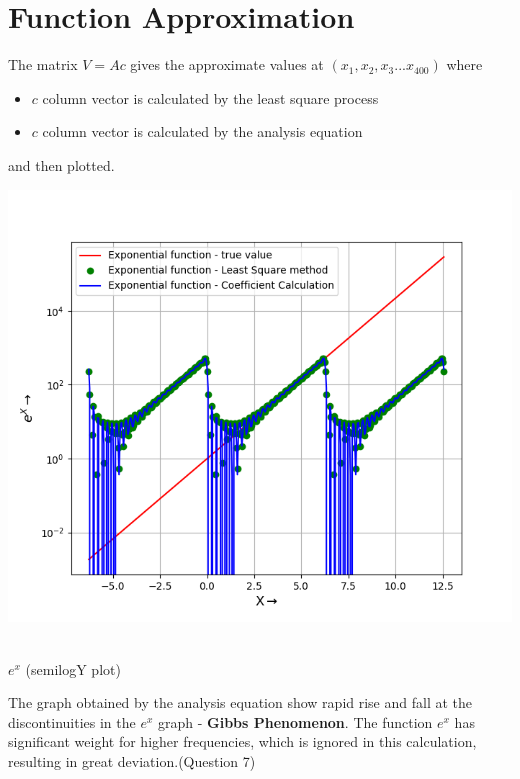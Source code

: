 \documentclass[12pt, a4paper]{report}
\begin{document}
\section*{Function Approximation}

The matrix $V = Ac$ gives the approximate values at $(x_1,x_2,x_3...x_{400})$ where 
\begin{itemize}
  	\item $c$ column vector is calculated by the least square process
  	\item $c$ column vector is calculated by the analysis equation
\end{itemize}
and then plotted.

\begin{center}
	\includegraphics[scale=0.85]{Figure_11} 
	\caption{\\$e^x$ (semilogY plot)}
	\label{fig:rawdata}
\end{center}

The graph obtained by the analysis equation show rapid rise and fall at the discontinuities in the $e^x$ graph - \textbf{Gibbs Phenomenon}. The function $e^x$ has significant weight for higher frequencies, which is ignored in this calculation, resulting in great deviation.(Question 7) 
\end{document}
